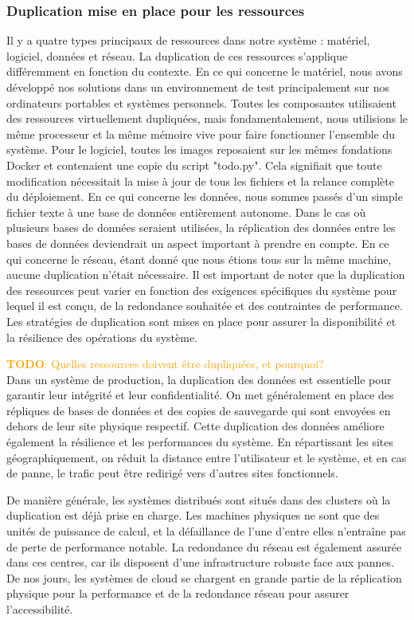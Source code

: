 \documentclass[a11paper, 11pt]{article}
\newcommand{\todo}[1]{\textcolor{orange}{\textbf{TODO}: #1}}
\begin{document}
\subsubsection{Duplication mise en place pour les ressources}
Il y a quatre types principaux de ressources dans notre système : matériel, logiciel, données et réseau. La duplication de ces ressources s'applique différemment en fonction du contexte.
En ce qui concerne le matériel, nous avons développé nos solutions dans un environnement de test principalement sur nos ordinateurs portables et systèmes personnels. Toutes les composantes utilisaient des ressources virtuellement dupliquées, mais fondamentalement, nous utilisions le même processeur et la même mémoire vive pour faire fonctionner l'ensemble du système.
Pour le logiciel, toutes les images reposaient sur les mêmes fondations Docker et contenaient une copie du script "todo.py". Cela signifiait que toute modification nécessitait la mise à jour de tous les fichiers et la relance complète du déploiement.
En ce qui concerne les données, nous sommes passés d'un simple fichier texte à une base de données entièrement autonome. Dans le cas où plusieurs bases de données seraient utilisées, la réplication des données entre les bases de données deviendrait un aspect important à prendre en compte.
En ce qui concerne le réseau, étant donné que nous étions tous sur la même machine, aucune duplication n'était nécessaire.
Il est important de noter que la duplication des ressources peut varier en fonction des exigences spécifiques du système pour lequel il est conçu, de la redondance souhaitée et des contraintes de performance. Les stratégies de duplication sont mises en place pour assurer la disponibilité et la résilience des opérations du système.



\todo{Quelles ressources doivent être dupliquées, et pourquoi?} \\
Dans un système de production, la duplication des données est essentielle pour garantir leur intégrité et leur confidentialité. On met généralement en place des répliques de bases de données et des copies de sauvegarde qui sont envoyées en dehors de leur site physique respectif. Cette duplication des données améliore également la résilience et les performances du système. En répartissant les sites géographiquement, on réduit la distance entre l'utilisateur et le système, et en cas de panne, le trafic peut être redirigé vers d'autres sites fonctionnels.


De manière générale, les systèmes distribués sont situés dans des clusters où la duplication est déjà prise en charge. Les machines physiques ne sont que des unités de puissance de calcul, et la défaillance de l'une d'entre elles n'entraîne pas de perte de performance notable. La redondance du réseau est également assurée dans ces centres, car ils disposent d'une infrastructure robuste face aux pannes. De nos jours, les systèmes de cloud se chargent en grande partie de la réplication physique pour la performance et de la redondance réseau pour assurer l'accessibilité. 
\end{document}

